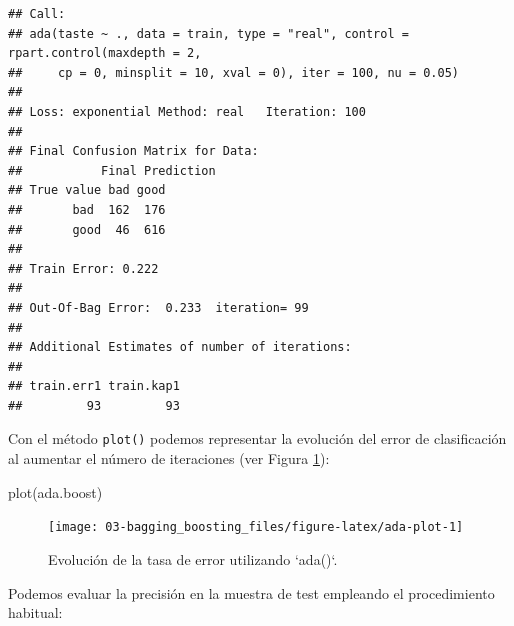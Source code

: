 \documentclass[
  spanish,
]{book}
\newenvironment{Shaded}{\begin{snugshade}}{\end{snugshade}}
\newcommand{\AttributeTok}[1]{\textcolor[rgb]{0.77,0.63,0.00}{#1}}
\newcommand{\FunctionTok}[1]{\textcolor[rgb]{0.00,0.00,0.00}{#1}}
\newcommand{\NormalTok}[1]{#1}
\newcommand{\OtherTok}[1]{\textcolor[rgb]{0.56,0.35,0.01}{#1}}
\newcommand{\SpecialCharTok}[1]{\textcolor[rgb]{0.00,0.00,0.00}{#1}}
\newcommand{\StringTok}[1]{\textcolor[rgb]{0.31,0.60,0.02}{#1}}
\theoremstyle{break}
\theoremstyle{definition}
\theoremstyle{definition}
\theoremstyle{definition}
\theoremstyle{definition}
\theoremstyle{remark}
\begin{document}
\begin{verbatim}
## Call:
## ada(taste ~ ., data = train, type = "real", control = rpart.control(maxdepth = 2, 
##     cp = 0, minsplit = 10, xval = 0), iter = 100, nu = 0.05)
## 
## Loss: exponential Method: real   Iteration: 100 
## 
## Final Confusion Matrix for Data:
##           Final Prediction
## True value bad good
##       bad  162  176
##       good  46  616
## 
## Train Error: 0.222 
## 
## Out-Of-Bag Error:  0.233  iteration= 99 
## 
## Additional Estimates of number of iterations:
## 
## train.err1 train.kap1 
##         93         93
\end{verbatim}

Con el método \texttt{plot()} podemos representar la evolución del error de clasificación al aumentar el número de iteraciones (ver Figura \ref{fig:ada-plot}):

\begin{Shaded}
\begin{Highlighting}[]
\FunctionTok{plot}\NormalTok{(ada.boost)}
\end{Highlighting}
\end{Shaded}

\begin{figure}[!htb]

{\centering \texttt{[image: 03-bagging\_boosting\_files/figure-latex/ada-plot-1]} 

}

\caption{Evolución de la tasa de error utilizando `ada()`.}\label{fig:ada-plot}
\end{figure}

Podemos evaluar la precisión en la muestra de test empleando el procedimiento habitual:

\begin{Shaded}
\end{Shaded}
\end{document}
